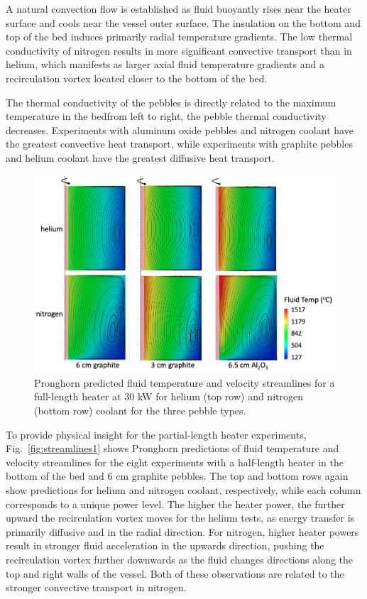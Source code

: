 A natural convection flow is established as fluid buoyantly rises near the heater surface and cools near the vessel outer surface. The insulation on the bottom and top of the bed induces primarily radial temperature gradients. The low thermal conductivity of nitrogen results in more significant convective transport than in helium, which manifests as larger axial fluid temperature gradients and a recirculation vortex located closer to the bottom of the bed. 

The thermal conductivity of the pebbles is directly related to the maximum temperature in the bed\mdash from left to right, the pebble thermal conductivity decreases. Experiments with aluminum oxide pebbles and nitrogen coolant have the greatest convective heat transport, while experiments with graphite pebbles and helium coolant have the greatest diffusive heat transport. 

\begin{figure}[h!]
\centering
\centerline{
\includegraphics[height=0.55\linewidth]{figs/sana_30kW_vel.png}}
\caption{Pronghorn predicted fluid temperature and velocity streamlines for a full-length heater at 30 \si{\kilo\watt} for helium (top row) and nitrogen (bottom row) coolant for the three pebble types.}
\label{fig:streamlines2}
\end{figure}

To provide physical insight for the partial-length heater experiments, Fig.\ \ref{fig:streamlines1} shows Pronghorn predictions of fluid temperature and velocity streamlines for the eight experiments with a half-length heater in the bottom of the bed and 6 \si{\centi\meter} graphite pebbles. The top and bottom rows again show predictions for helium and nitrogen coolant, respectively, while each column corresponds to a unique power level. The higher the heater power, the further upward the recirculation vortex moves for the helium tests, as energy transfer is primarily diffusive and in the radial direction. For nitrogen, higher heater powers result in stronger fluid acceleration in the upwards direction, pushing the recirculation vortex further downwards as the fluid changes directions along the top and right walls of the vessel. Both of these observations are related to the stronger convective transport in nitrogen.


